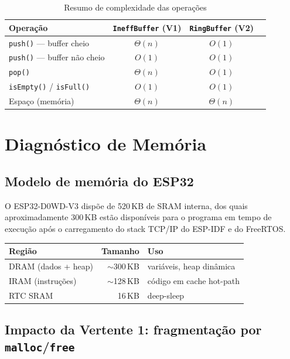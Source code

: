 \documentclass[12pt, a4paper]{article}
\theoremstyle{definition}
\theoremstyle{remark}
\begin{document}
\begin{table}[H]
  \centering
  \caption{Resumo de complexidade das operações}
  \label{tab:complexidade}
  \begin{tabular}{lccc}
    \toprule
    Operação & \texttt{IneffBuffer} (V1) & \texttt{RingBuffer} (V2) \\
    \midrule
    \texttt{push()} — buffer cheio    & $\Theta(n)$ & $O(1)$ \\
    \texttt{push()} — buffer não cheio & $O(1)$     & $O(1)$ \\
    \texttt{pop()}                    & $\Theta(n)$ & $O(1)$ \\
    \texttt{isEmpty()} / \texttt{isFull()} & $O(1)$ & $O(1)$ \\
    Espaço (memória)                  & $\Theta(n)$ & $\Theta(n)$ \\
    \bottomrule
  \end{tabular}
\end{table}

\section{Diagnóstico de Memória}

\subsection{Modelo de memória do ESP32}

O ESP32-D0WD-V3 dispõe de 520\,KB de SRAM interna, dos quais aproximadamente
300\,KB estão disponíveis para o programa em tempo de execução após o
carregamento do stack TCP/IP do ESP-IDF e do FreeRTOS.

\begin{center}
\begin{tabular}{lrl}
  \toprule
  Região & Tamanho & Uso \\
  \midrule
  DRAM (dados + heap)   & $\sim$300\,KB & variáveis, heap dinâmica \\
  IRAM (instruções)     & $\sim$128\,KB & código em cache hot-path \\
  RTC SRAM              & 16\,KB        & deep-sleep \\
  \bottomrule
\end{tabular}
\end{center}

\subsection{Impacto da Vertente 1: fragmentação por \texttt{malloc}/\texttt{free}}
\end{document}
